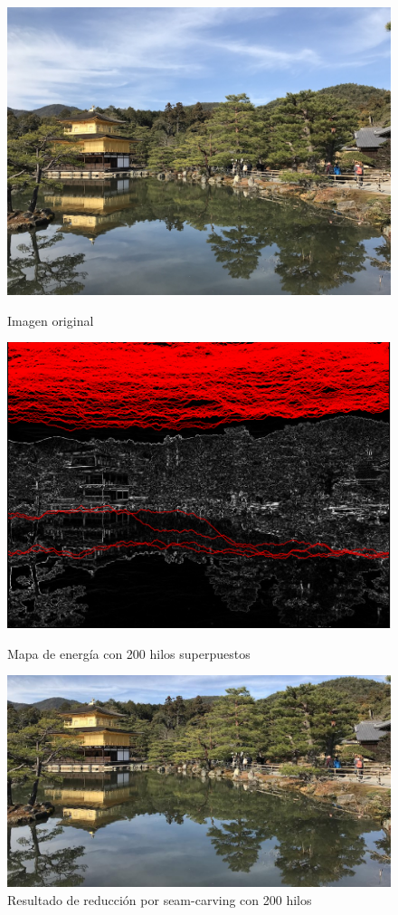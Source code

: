 \documentclass[12pt,a4paper,oneside]{article}
\begin{document}
\begin{figure}[!htb]
      \includegraphics[width=\linewidth]{kinkakuji.jpg}
      \caption{Imagen original}\label{kinkakujiorig}
    \endminipage\hfill
      \includegraphics[width=\linewidth]{200-reductionenergyhorizontal.png}
      \caption{Mapa de energía con 200 hilos superpuestos}\label{kinkakujienergy}
    \endminipage\hfill
      \includegraphics[width=\linewidth]{200-reductionhorizontal.jpg}
      \caption{Resultado de reducción por seam-carving con 200 hilos}\label{kinkakujiseam}
    \endminipage
\end{figure}
\end{document}
